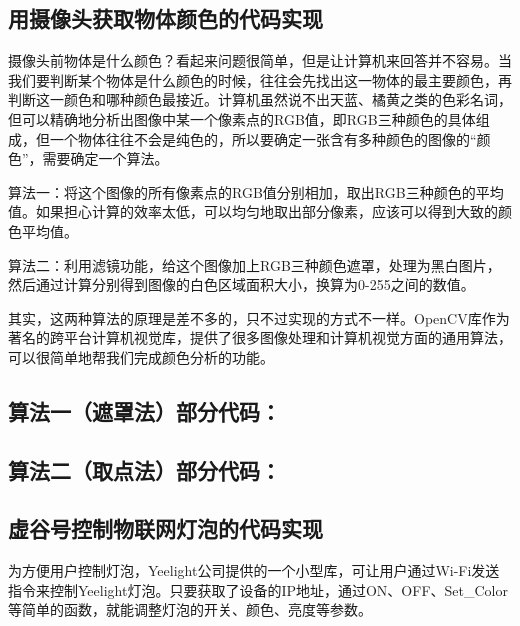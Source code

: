 \documentclass[letterpaper,10pt,english]{sphinxmanual}
\begin{document}
\noindent{}


\subsection{用摄像头获取物体颜色的代码实现}
\label{\detokenize{09.case/9.1-yeelight:id3}}
摄像头前物体是什么颜色？看起来问题很简单，但是让计算机来回答并不容易。当我们要判断某个物体是什么颜色的时候，往往会先找出这一物体的最主要颜色，再判断这一颜色和哪种颜色最接近。计算机虽然说不出天蓝、橘黄之类的色彩名词，但可以精确地分析出图像中某一个像素点的RGB值，即RGB三种颜色的具体组成，但一个物体往往不会是纯色的，所以要确定一张含有多种颜色的图像的“颜色”，需要确定一个算法。

算法一：将这个图像的所有像素点的RGB值分别相加，取出RGB三种颜色的平均值。如果担心计算的效率太低，可以均匀地取出部分像素，应该可以得到大致的颜色平均值。

算法二：利用滤镜功能，给这个图像加上RGB三种颜色遮罩，处理为黑白图片，然后通过计算分别得到图像的白色区域面积大小，换算为0-255之间的数值。

\noindent{}

其实，这两种算法的原理是差不多的，只不过实现的方式不一样。OpenCV库作为著名的跨平台计算机视觉库，提供了很多图像处理和计算机视觉方面的通用算法，可以很简单地帮我们完成颜色分析的功能。


\subsection{算法一（遮罩法）部分代码：}
\label{\detokenize{09.case/9.1-yeelight:id4}}
\noindent{}


\subsection{算法二（取点法）部分代码：}
\label{\detokenize{09.case/9.1-yeelight:id5}}
\noindent{}


\subsection{虚谷号控制物联网灯泡的代码实现}
\label{\detokenize{09.case/9.1-yeelight:id6}}
为方便用户控制灯泡，Yeelight公司提供的一个小型库，可让用户通过Wi-Fi发送指令来控制Yeelight灯泡。只要获取了设备的IP地址，通过ON、OFF、Set\_Color等简单的函数，就能调整灯泡的开关、颜色、亮度等参数。
\end{document}
